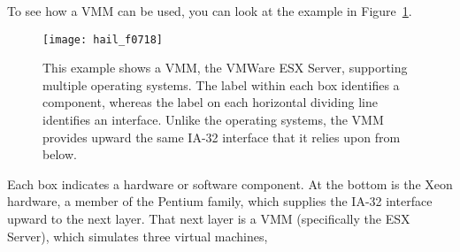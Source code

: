 To see how a VMM can be used, you can look at the example in
Figure~\ref{vmm-example}.
\begin{figure}
\centerline{\texttt{[image: hail\_f0718]}}
\iffalse
\centerline{\begin{graph}(350,125)
\linethickness{.02pt}
\graphnodecolour{1}
\enlargeboxes{2}
\rectnode{hardware}[350,30](175,15)
\autonodetext{hardware}{Hardware including Xeon processor}
\rectnode{VMM}[350,30](175,45)[\fillednodesfalse]
\autonodetext{VMM}{VMware ESX Server}
\rectnode{VM1}[70,30](35,75)
\autonodetext{VM1}{Linux 2.6}
\rectnode{VM2}[140,30](140,75)[\fillednodesfalse]
\autonodetext{VM2}{Windows 2003}
\rectnode{VM3}[140,30](280,75)[\fillednodesfalse]
\autonodetext{VM3}{Linux 2.4}
\rectnode{P1a}[70,30](35,105)
\autonodetext{P1a}{Apache}
\rectnode{P2a}[70,30](105,105)
\autonodetext{P2a}{SQL Server}
\rectnode{P2b}[70,30](175,105)
\autonodetext{P2b}{IIS}
\rectnode{P3a}[70,30](245,105)
\autonodetext{P3a}{Oracle}
\rectnode{P3b}[70,30](315,105)
\autonodetext{P3b}{Apache}
\textnode{hardware-VMM}(175,30){IA-32}[\graphlinecolour{1}]
\textnode{VMM-VM1}(35,60){IA-32}[\graphlinecolour{1}]
\textnode{VMM-VM2}(140,60){IA-32}[\graphlinecolour{1}]
\textnode{VMM-VM3}(280,60){IA-32}[\graphlinecolour{1}]
\textnode{VM1-P1a}(35,90){POSIX}[\graphlinecolour{1}]
\textnode{VM1-P2a}(105,90){Win32}[\graphlinecolour{1}]
\textnode{VM1-P2b}(175,90){Win32}[\graphlinecolour{1}]
\textnode{VM1-P3a}(245,90){POSIX}[\graphlinecolour{1}]
\textnode{VM1-P3b}(315,90){POSIX}[\graphlinecolour{1}]
\textnode{P1a-Net}(35,120){HTTP}[\graphlinecolour{1}]
\textnode{P2a-Net}(105,120){ODBC}[\graphlinecolour{1}]
\textnode{P2b-Net}(175,120){HTTP}[\graphlinecolour{1}]
\textnode{P3a-Net}(245,120){ODBC}[\graphlinecolour{1}]
\textnode{P3b-Net}(315,120){HTTP}[\graphlinecolour{1}]
\put(70,60){\line(0,-1){7}}
\put(210,60){\line(0,-1){7}}
\put(140,90){\line(0,-1){7}}
\put(280,90){\line(0,-1){7}}
\end{graph}}
\fi
\caption{This example shows a VMM, the VMWare ESX Server, supporting multiple operating
  systems.  The label within each box identifies a component, whereas
  the label on each horizontal dividing line identifies an interface.
  Unlike the operating systems, the VMM provides upward the same IA-32
  interface that it relies upon from below.}
\label{vmm-example}
\end{figure}
Each box indicates a hardware or software component.
At the bottom is the Xeon hardware, a member of the Pentium family,
which supplies the IA-32
interface upward to the next layer.  That next layer is a VMM
(specifically the ESX Server), which simulates three virtual machines,
